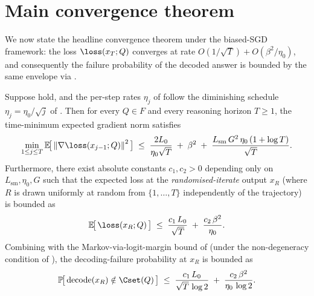 \section{Main convergence theorem}
\label{sec:main_theorem}

We now state the headline convergence theorem under the biased-SGD
framework: the loss $\loss(x_T; Q)$ converges at rate
$O(1/\sqrt T) + O(\beta^2/\eta_0)$, and consequently the failure
probability of the decoded answer is bounded by the same envelope via
.

\begin{theorem}\label{thm:main_convergence_biased_sgd}
Suppose
hold, and the per-step rates $\eta_j$ of
 follow the
diminishing schedule
$\eta_j = \eta_0/\sqrt j$ of . Then for every
$Q \in F$ and every reasoning horizon $T \ge 1$, the time-minimum
expected gradient norm satisfies
\begin{align}\label{eq:main_grad_bound}
   \min_{1 \le j \le T} \E\!\bigl[\, \norm{\nabla \loss(x_{j-1}; Q)}^2 \,\bigr]
   \;\le\;
   \frac{2 L_0}{\eta_0 \sqrt T}
   \;+\; \beta^2
   \;+\; \frac{L_{\mathrm{sm}}\, G^2\, \eta_0\, (1 + \log T)}{\sqrt T}.
\end{align}
Furthermore, there exist absolute constants $c_1, c_2 > 0$ depending only
on $L_{\mathrm{sm}}, \eta_0, G$ such that the expected loss at the
\emph{randomised-iterate} output $x_R$ (where $R$ is drawn uniformly at
random from $\{1, \dots, T\}$ independently of the trajectory) is
bounded as
\begin{align}\label{eq:main_loss_bound}
   \E\!\bigl[\, \loss(x_R; Q) \,\bigr]
   \;\le\;
   \frac{c_1\, L_0}{\sqrt T}
   \;+\; \frac{c_2\, \beta^2}{\eta_0}.
\end{align}
Combining with the Markov-via-logit-margin bound of
 (under the non-degeneracy condition
 of ),
the decoding-failure probability at $x_R$ is bounded as
\begin{align}\label{eq:main_failure_bound}
   \Pr\!\bigl[\, \dec(x_R) \notin \Cset(Q) \,\bigr]
   \;\le\;
   \frac{c_1\, L_0}{\sqrt T\, \log 2}
   \;+\; \frac{c_2\, \beta^2}{\eta_0\, \log 2}.
\end{align}
\end{theorem}


